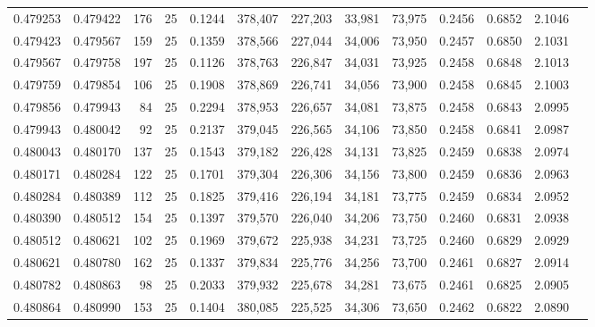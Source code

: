 \begin{tabular}{rrrrrrrrrrrrr}
0.479253 & 0.479422 &   176 &  25 &                                     0.1244 & 378,407 & 227,203 &  33,981 &  73,975 & 0.2456 & 0.6852 & 2.1046 \\
0.479423 & 0.479567 &   159 &  25 &                                     0.1359 & 378,566 & 227,044 &  34,006 &  73,950 & 0.2457 & 0.6850 & 2.1031 \\
0.479567 & 0.479758 &   197 &  25 &                                     0.1126 & 378,763 & 226,847 &  34,031 &  73,925 & 0.2458 & 0.6848 & 2.1013 \\
0.479759 & 0.479854 &   106 &  25 &                                     0.1908 & 378,869 & 226,741 &  34,056 &  73,900 & 0.2458 & 0.6845 & 2.1003 \\
0.479856 & 0.479943 &    84 &  25 &                                     0.2294 & 378,953 & 226,657 &  34,081 &  73,875 & 0.2458 & 0.6843 & 2.0995 \\
0.479943 & 0.480042 &    92 &  25 &                                     0.2137 & 379,045 & 226,565 &  34,106 &  73,850 & 0.2458 & 0.6841 & 2.0987 \\
0.480043 & 0.480170 &   137 &  25 &                                     0.1543 & 379,182 & 226,428 &  34,131 &  73,825 & 0.2459 & 0.6838 & 2.0974 \\
0.480171 & 0.480284 &   122 &  25 &                                     0.1701 & 379,304 & 226,306 &  34,156 &  73,800 & 0.2459 & 0.6836 & 2.0963 \\
0.480284 & 0.480389 &   112 &  25 &                                     0.1825 & 379,416 & 226,194 &  34,181 &  73,775 & 0.2459 & 0.6834 & 2.0952 \\
0.480390 & 0.480512 &   154 &  25 &                                     0.1397 & 379,570 & 226,040 &  34,206 &  73,750 & 0.2460 & 0.6831 & 2.0938 \\
0.480512 & 0.480621 &   102 &  25 &                                     0.1969 & 379,672 & 225,938 &  34,231 &  73,725 & 0.2460 & 0.6829 & 2.0929 \\
0.480621 & 0.480780 &   162 &  25 &                                     0.1337 & 379,834 & 225,776 &  34,256 &  73,700 & 0.2461 & 0.6827 & 2.0914 \\
0.480782 & 0.480863 &    98 &  25 &                                     0.2033 & 379,932 & 225,678 &  34,281 &  73,675 & 0.2461 & 0.6825 & 2.0905 \\
0.480864 & 0.480990 &   153 &  25 &                                     0.1404 & 380,085 & 225,525 &  34,306 &  73,650 & 0.2462 & 0.6822 & 2.0890 \\

\end{tabular}
